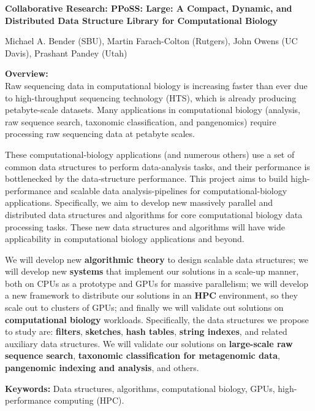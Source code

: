
\begin{center}
\bf
\Large
Collaborative Research: PPoSS\@: Large: A Compact, Dynamic, and Distributed Data
Structure Library for Computational Biology

\medskip
\small
Michael A. Bender (SBU), Martin Farach-Colton (Rutgers), John Owens (UC Davis),
Prashant Pandey (Utah)
\end{center}

\noindent \textbf{\large Overview:}\\
Raw sequencing data in computational biology is increasing faster than ever due to high-throughput sequencing technology (HTS), which is already producing petabyte-scale datasets. Many applications in computational biology (\kmer analysis, raw sequence search, taxonomic classification, and pangenomics) require processing raw sequencing data at petabyte scales.

These computational-biology applications (and numerous others) use a set of common data structures to perform data-analysis tasks, and their performance is bottlenecked by  the data-structure performance.
%
This project aims to build high-performance and scalable data analysis-pipelines for computational-biology applications. Specifically, we aim to develop new massively parallel and distributed data structures and algorithms for core computational biology data processing tasks. These new data structures and algorithms will have wide applicability in computational biology applications and beyond.

We will develop new \textbf{algorithmic theory} to design scalable data structures; we will develop new \textbf{systems} that implement our solutions in a scale-up manner,  both on CPUs as a prototype and GPUs for massive parallelism; we will develop a new framework to distribute our solutions in an \textbf{HPC} environment, so they  scale out to clusters of GPUs; and finally we will validate out solutions on \textbf{computational biology} workloads.
%
Specifically, the data structures we propose to study are: \textbf{filters}, \textbf{sketches}, \textbf{hash tables}, \textbf{string indexes}, and related auxiliary data structures.  We will validate our solutions on \textbf{large-scale raw sequence search}, \textbf{taxonomic classification for metagenomic data}, \textbf{pangenomic indexing and analysis}, and others.


\noindent \textbf{\large Keywords:} Data structures, algorithms, computational biology, GPUs, high-performance computing (HPC).

